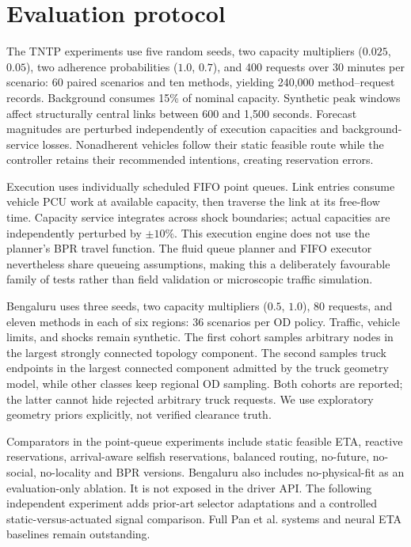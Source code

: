 \documentclass[sigconf,anonymous,review]{acmart}
\begin{document}
\section{Evaluation protocol}
The TNTP experiments use five random seeds, two capacity multipliers ($0.025$, $0.05$), two adherence probabilities ($1.0$, $0.7$), and 400 requests over 30 minutes per scenario: 60 paired scenarios and ten methods, yielding 240,000 method--request records. Background consumes 15\% of nominal capacity. Synthetic peak windows affect structurally central links between 600 and 1,500 seconds. Forecast magnitudes are perturbed independently of execution capacities and background-service losses. Nonadherent vehicles follow their static feasible route while the controller retains their recommended intentions, creating reservation errors.

Execution uses individually scheduled FIFO point queues. Link entries consume vehicle PCU work at available capacity, then traverse the link at its free-flow time. Capacity service integrates across shock boundaries; actual capacities are independently perturbed by $\pm10\%$. This execution engine does not use the planner's BPR travel function. The fluid queue planner and FIFO executor nevertheless share queueing assumptions, making this a deliberately favourable family of tests rather than field validation or microscopic traffic simulation.

Bengaluru uses three seeds, two capacity multipliers ($0.5$, $1.0$), 80 requests, and eleven methods in each of six regions: 36 scenarios per OD policy. Traffic, vehicle limits, and shocks remain synthetic. The first cohort samples arbitrary nodes in the largest strongly connected topology component. The second samples truck endpoints in the largest connected component admitted by the truck geometry model, while other classes keep regional OD sampling. Both cohorts are reported; the latter cannot hide rejected arbitrary truck requests. We use exploratory geometry priors explicitly, not verified clearance truth.

Comparators in the point-queue experiments include static feasible ETA, reactive reservations, arrival-aware selfish reservations, balanced routing, no-future, no-social, no-locality and BPR versions. Bengaluru also includes no-physical-fit as an evaluation-only ablation. It is not exposed in the driver API. The following independent experiment adds prior-art selector adaptations and a controlled static-versus-actuated signal comparison. Full Pan et al. systems and neural ETA baselines remain outstanding.
\end{document}
